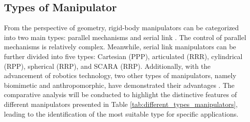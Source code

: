 \subsection{Types of Manipulator}
From the perspective of geometry, rigid-body manipulators can be categorized into two main types: parallel 
mechanisms and serial link \cite{MECH0089book}. The control of parallel mechanisms is relatively complex. 
Meanwhile, serial link manipulators can be further divided into five types: Cartesian (PPP), articulated (RRR), 
cylindrical (RPP), spherical (RRP), and SCARA (RRP). Additionally, with the advancement of robotics technology, 
two other types of manipulators, namely biomimetic and anthropomorphic, have demonstrated their advantages 
\cite{manipulators_types1,manipulators_types2}.
The comparative analysis will be conducted to highlight the distinctive features of different manipulators 
presented in Table \ref{tab:different_types_manipulators}, leading to the identification of the most suitable 
type for specific applications.
